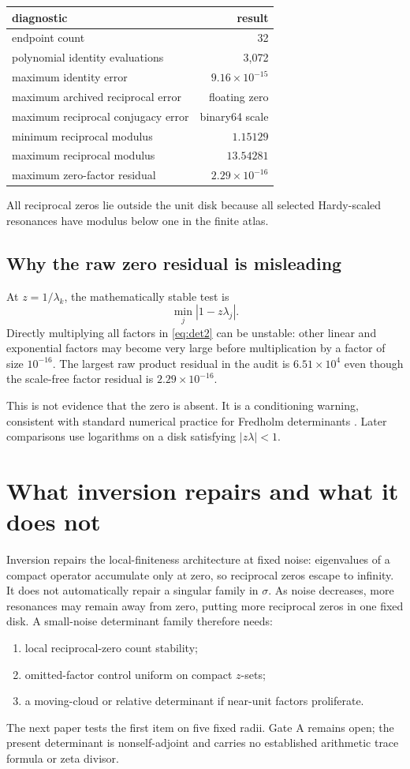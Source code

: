 \documentclass[11pt]{article}
\theoremstyle{remark}\newtheorem{remark}[theorem]{Remark}
\begin{document}
\begin{center}
\begin{tabular}{lr}
\toprule
diagnostic & result\\
\midrule
endpoint count & 32\\
polynomial identity evaluations & 3,072\\
maximum identity error & $9.16\times10^{-15}$\\
maximum archived reciprocal error & floating zero\\
maximum reciprocal conjugacy error & binary64 scale\\
minimum reciprocal modulus & $1.15129$\\
maximum reciprocal modulus & $13.54281$\\
maximum zero-factor residual & $2.29\times10^{-16}$\\
\bottomrule
\end{tabular}
\end{center}

All reciprocal zeros lie outside the unit disk because all selected
Hardy-scaled resonances have modulus below one in the finite atlas.

\subsection{Why the raw zero residual is misleading}

At $z=1/\lambda_k$, the mathematically stable test is
\[
 \min_j|1-z\lambda_j|.
\]
Directly multiplying all factors in \eqref{eq:det2} can be unstable: other
linear and exponential factors may become very large before multiplication by
a factor of size $10^{-16}$. The largest raw product residual in the audit is
$6.51\times10^4$ even though the scale-free factor residual is
$2.29\times10^{-16}$.

This is not evidence that the zero is absent. It is a conditioning warning,
consistent with standard numerical practice for Fredholm determinants
\citep{Bornemann2010}. Later comparisons use logarithms on a disk satisfying
$|z\lambda|<1$.

\section{What inversion repairs and what it does not}

Inversion repairs the local-finiteness architecture at fixed noise:
eigenvalues of a compact operator accumulate only at zero, so reciprocal
zeros escape to infinity. It does not automatically repair a singular
family in $\sigma$. As noise decreases, more resonances may remain away from
zero, putting more reciprocal zeros in one fixed disk. A small-noise
determinant family therefore needs:
\begin{enumerate}[leftmargin=2em]
\item local reciprocal-zero count stability;
\item omitted-factor control uniform on compact $z$-sets;
\item a moving-cloud or relative determinant if near-unit factors proliferate.
\end{enumerate}

The next paper tests the first item on five fixed radii. Gate A remains open;
the present determinant is nonself-adjoint and carries no established
arithmetic trace formula or zeta divisor.



\end{document}
